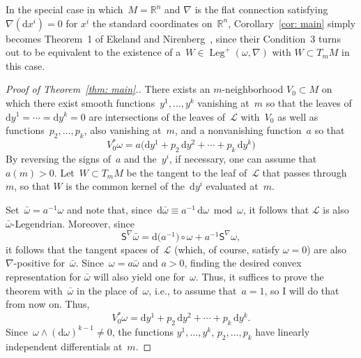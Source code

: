 \documentclass[pdftex]{sigma}
\renewcommand{\d}{\mathrm{d}}%
\newcommand{\cL}{{\mathcal L}}
\newcommand{\bbR}{{\mathbb R}}
\newcommand{\Leg}{\operatorname{Leg}}
\newcommand{\Ss}{\mathsf{S}}
\newcommand{\w}{\wedge}
\numberwithin{equation}{section}
\begin{document}
\begin{Remark}
In the special case in which~$M=\bbR^n$ and $\nabla$ is the flat
connection satisfying~$\nabla(\d x^i)=0$ for $x^i$ the standard
coordinates on~$\bbR^n$, Corollary~\ref{cor: main}
simply becomes Theorem~1 of Ekeland and Nirenberg~\cite{MR2023129},
since their Condition~3 turns out to be equivalent
to the existence of a~$W\in\Leg^+(\omega,\nabla)$ with $W\subset T_mM$
in this case.
\end{Remark}

\begin{proof}[Proof of Theorem~\ref{thm: main}.]
There exists an $m$-neighborhood $V_0\subset M$
on which there exist smooth functions~$y^1,\ldots,y^k$
vanishing at~$m$
so that the leaves of $\d y^1 =\cdots =\d y^k = 0$
are intersections of the leaves of~$\cL$ with~$V_0$
as well as functions~$p_2,\ldots,p_k$, also vanishing
at~$m$, and a nonvanishing function~$a$ so that
\[
V_0^*\omega
= a\bigl(\d y^1 + p_2\,\d y^2 +\cdots + p_k\,\d y^k\bigr)
\]
By reversing the signs of~$a$ and the~$y^i$,
if necessary, one can assume that~$a(m)>0$.
Let~$W\subset T_mM$ be the tangent to the leaf of~$\cL$
that passes through~$m$, so that $W$ is the common kernel
of the~$\d y^i$ evaluated at~$m$.

Set~$\bar\omega = a^{-1}\omega$ and note that,
since~$\d\bar\omega \equiv a^{-1}\,\d\omega \bmod \omega$,
it follows that $\cL$ is also $\bar\omega$-Legendrian.
Moreover, since
\[
\Ss^\nabla\bar\omega = \d\big(a^{-1}\big)\circ\omega + a^{-1} \Ss^\nabla\omega,
\]
it follows that the tangent spaces of~$\cL$
(which, of course, satisfy $\omega=0$)
are also $\nabla$-positive for~$\bar\omega$.
Since~$\omega = a \bar\omega$ and $a>0$,
finding the desired convex representation for $\bar\omega$
will also yield one for~$\omega$.
Thus, it suffices to prove the theorem with~$\bar\omega$
in the place of~$\omega$, i.e., to assume that~$a=1$,
so I will do that from now on. Thus,
\[
V_0^*\omega = \d y^1 + p_2\,\d y^2 +\cdots + p_k\,\d y^k.
\]
Since~$\omega\w(\d\omega)^{k-1}\not=0$, the functions
$y^1,\ldots,y^k$, $p_2,\ldots,p_k$ have linearly independent differentials
at~$m$.


\end{proof}
\end{document}
